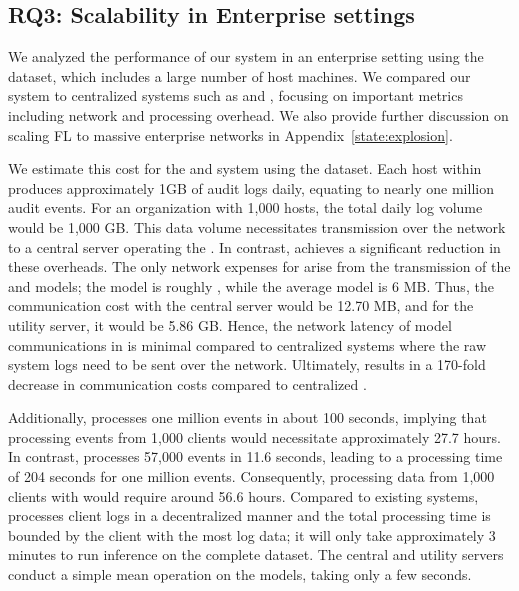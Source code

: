 
\subsection{RQ3: Scalability in Enterprise settings}
\label{cost_metric}
We analyzed the performance of our system in an enterprise setting using the \optc dataset, which includes a large number of host machines. We compared our system to centralized systems such as \flash and \kairos, focusing on important metrics including network and processing overhead. We also provide further discussion on scaling FL to massive enterprise networks in Appendix~\ref{state:explosion}.

 We estimate this cost for the \flash and \kairos system using the \optc dataset. Each host within \optc produces approximately 1GB of audit logs daily, equating to nearly one million audit events. For an organization with 1,000 hosts, the total daily log volume would be 1,000 GB. This data volume necessitates transmission over the network to a central server operating the \pids. In contrast, \Sys achieves a significant reduction in these overheads. The only network expenses for \Sys arise from the transmission of the \gnnshort and \wordvec models; the \gnnshort model is roughly \modelsize, while the average \wordvec model is 6 MB. Thus, the communication cost with the central server would be 12.70 MB, and for the utility server, it would be 5.86 GB. Hence, the network latency of model communications in \Sys is minimal compared to centralized systems where the raw system logs need to be sent over the network. Ultimately, \Sys results in a 170-fold decrease in communication costs compared to centralized \pids.  

 Additionally, \flash processes one million events in about 100 seconds, implying that processing events from 1,000 clients would necessitate approximately 27.7 hours. In contrast, \kairos processes 57,000 events in 11.6 seconds, leading to a processing time of 204 seconds for one million events. Consequently, processing data from 1,000 clients with \kairos would require around 56.6 hours. Compared to existing systems, \Sys processes client logs in a decentralized manner and the total processing time is bounded by the client with the most log data; it will only take approximately 3 minutes to run inference on the complete \optc dataset. The central and utility servers conduct a simple mean operation on the models, taking only a few seconds.

